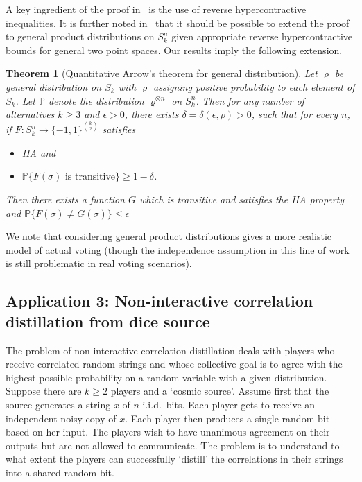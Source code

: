 \documentclass[11pt]{amsart}
\newcommand{\PP}{\mathbb{P}}
\newcommand{\eps}{\epsilon}
\newcommand{\1}{\mathbf{1}}
\theoremstyle{definition}
\theoremstyle{plain}
\newtheorem{theorem}[example]{Theorem}
\theoremstyle{remark}
\numberwithin{equation}{section}
\begin{document}
A key ingredient of the proof in~\cite{Mossel11} is the use of reverse hypercontractive inequalities.
It is further noted in~\cite{Mossel11} that it should be possible to extend the proof to general product distributions on $S_k^n$ given appropriate reverse hypercontractive bounds for general two point spaces. Our results imply the following extension. 

\begin{theorem}[Quantitative Arrow's theorem for general distribution] \label{thm:maingeneralintro}
Let $\varrho$ be general distribution on $S_k$ with $\varrho$ assigning positive probability to each element of $S_k$. Let $\PP$ denote the distribution $\varrho^{\otimes n}$ on $S_k^n$. Then
for any number of alternatives $k \geq 3$ and $\eps > 0$,
there exists $\delta = \delta(\eps, \rho)>0$, such that for every $n$, if $F : S_k^n \to \{-1,1\}^{k \choose 2}$
satisfies
\begin{itemize}
\item
IIA and
\item
$\PP \{F(\sigma) \mbox{ is transitive}\} \geq 1-\delta$.
\end{itemize}
Then there exists a function $G$ which is transitive and satisfies the IIA property and
$\PP\{F(\sigma) \neq G(\sigma)\} \leq \eps$
\end{theorem}

We note that considering general product distributions gives a more realistic model of actual voting (though the independence assumption in this line of work is still problematic in real voting scenarios). 

\subsection{Application 3: Non-interactive correlation distillation from dice source}
The problem of non-interactive correlation distillation deals with players who receive correlated
random strings and whose collective goal is to agree with the highest possible probability on a random variable
with a given distribution.
Suppose there are $k \ge 2$ players and a `cosmic source'.
Assume first that the  source generates a  string $x$ of  $n$ i.i.d.\ bits.
Each player gets to receive an independent noisy copy of $x$.  Each player then produces a single random bit based on her input. The players wish to have unanimous agreement on their outputs but are not allowed to communicate.
The problem is to understand to what extent the players can successfully `distill' the correlations in their strings into a shared random bit.
\end{document}
